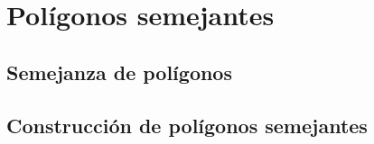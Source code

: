 \thispagestyle{plain}
\section{Polígonos semejantes}
\subsection{Semejanza de polígonos}
\subsection{Construcción de polígonos semejantes}

\newpage